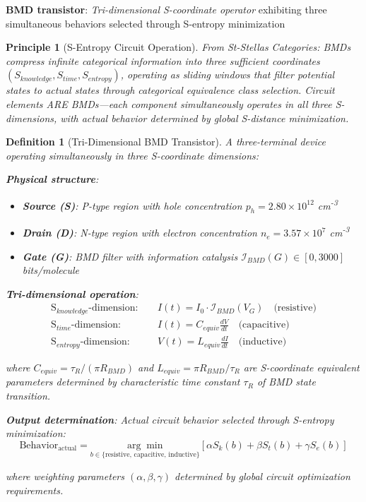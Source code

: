\documentclass[11pt,a4paper]{article}
\newtheorem{definition}{Definition}[section]
\newtheorem{principle}{Principle}[section]
\begin{document}
\textbf{BMD transistor}: \textit{Tri-dimensional S-coordinate operator} exhibiting three simultaneous behaviors selected through S-entropy minimization

\begin{principle}[S-Entropy Circuit Operation]
From St-Stellas Categories\cite{stellas_categories}: BMDs compress infinite categorical information into three sufficient coordinates $(S_{knowledge}, S_{time}, S_{entropy})$, operating as sliding windows that filter potential states to actual states through categorical equivalence class selection. Circuit elements ARE BMDs—each component simultaneously operates in all three S-dimensions, with actual behavior determined by global S-distance minimization.
\end{principle}

\begin{definition}[Tri-Dimensional BMD Transistor]
A three-terminal device operating simultaneously in three S-coordinate dimensions:

\textbf{Physical structure}:
\begin{itemize}
\item \textbf{Source (S)}: P-type region with hole concentration $p_h = 2.80\times10^{12}$ cm\textsuperscript{-3}
\item \textbf{Drain (D)}: N-type region with electron concentration $n_e = 3.57\times10^{7}$ cm\textsuperscript{-3}
\item \textbf{Gate (G)}: BMD filter with information catalysis $\mathcal{I}_{BMD}(G) \in [0, 3000]$ bits/molecule
\end{itemize}

\textbf{Tri-dimensional operation}:
\begin{align}
\text{S}_{knowledge}\text{-dimension}: \quad &I(t) = I_0 \cdot \mathcal{I}_{BMD}(V_G) \quad \text{(resistive)} \\
\text{S}_{time}\text{-dimension}: \quad &I(t) = C_{equiv} \frac{dV}{dt} \quad \text{(capacitive)} \\
\text{S}_{entropy}\text{-dimension}: \quad &V(t) = L_{equiv} \frac{dI}{dt} \quad \text{(inductive)}
\end{align}

where $C_{equiv} = \tau_R/(\pi R_{BMD})$ and $L_{equiv} = \pi R_{BMD}/\tau_R$ are S-coordinate equivalent parameters determined by characteristic time constant $\tau_R$ of BMD state transition.

\textbf{Output determination}: Actual circuit behavior selected through S-entropy minimization:
\begin{equation}
\text{Behavior}_{\text{actual}} = \underset{b \in \{\text{resistive, capacitive, inductive}\}}{\arg\min} \left[ \alpha S_{k}(b) + \beta S_{t}(b) + \gamma S_{e}(b) \right]
\end{equation}

where weighting parameters $(\alpha, \beta, \gamma)$ determined by global circuit optimization requirements.
\end{definition}
\end{document}
